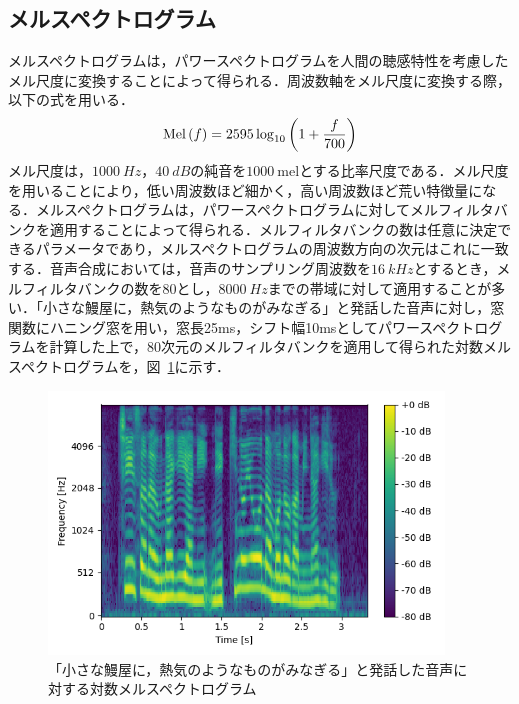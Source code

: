 \subsection{メルスペクトログラム}
メルスペクトログラムは，パワースペクトログラムを人間の聴感特性を考慮したメル尺度に変換することによって得られる．周波数軸をメル尺度に変換する際，以下の式を用いる．
\begin{equation}
    \text{Mel}\left(f\right) = 2595\log_{10} \left(1 + \frac{f}{700}\right)
\end{equation}
メル尺度は，$\SI[]{1000}{Hz}$，$\SI[]{40}{dB}$の純音を$\SI[]{1000}{\text{mel}}$とする比率尺度である．メル尺度を用いることにより，低い周波数ほど細かく，高い周波数ほど荒い特徴量になる．メルスペクトログラムは，パワースペクトログラムに対してメルフィルタバンクを適用することによって得られる．メルフィルタバンクの数は任意に決定できるパラメータであり，メルスペクトログラムの周波数方向の次元はこれに一致する．音声合成においては，音声のサンプリング周波数を$\SI[]{16}{kHz}$とするとき，メルフィルタバンクの数を80とし，$\SI[]{8000}{Hz}$までの帯域に対して適用することが多い．「小さな鰻屋に，熱気のようなものがみなぎる」と発話した音声に対し，窓関数にハニング窓を用い，窓長25ms，シフト幅10msとしてパワースペクトログラムを計算した上で，80次元のメルフィルタバンクを適用して得られた対数メルスペクトログラムを，図~\ref{sec2:fig:melspectrogram}に示す．
\begin{figure}[bt]
    \centering
    \includegraphics[height=70mm]{./figure/sec2/melspectrogram.png}
    \caption{「小さな鰻屋に，熱気のようなものがみなぎる」と発話した音声に対する対数メルスペクトログラム}
    \label{sec2:fig:melspectrogram}
\end{figure}